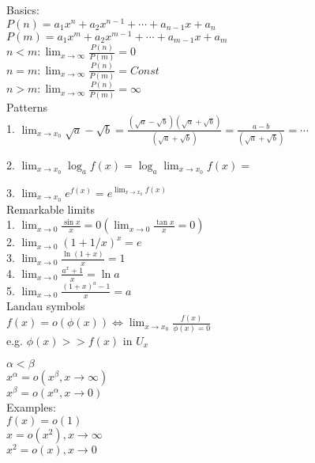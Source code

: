 \documentclass{letter}
\begin{document}
Basics: \\
$P(n)=a_1 x^n + a_2 x^{n-1} + \cdots + a_{n-1}x +  a_{n}$ \\
$P(m)=a_1 x^m + a_2 x^{m-1} + \cdots + a_{m-1}x +  a_{m}$ \\

$n < m: 
\lim_{x\to \infty} \frac{P(n)}{P(m)} = 0 $\\

$n = m: 
\lim_{x\to \infty} \frac{P(n)}{P(m)} = Const $\\

$n > m: 
\lim_{x\to \infty} \frac{P(n)}{P(m)} = \infty $\\

Patterns \\
1. $\lim_{x\to x_0} \sqrt{a} - \sqrt{b} = 
\frac{(\sqrt{a} - \sqrt{b})(\sqrt{a} + \sqrt{b})}{(\sqrt{a} + \sqrt{b})} =
\frac{a - b}{(\sqrt{a} + \sqrt{b})}  = \cdots $

2. $ \lim_{x\to x_0} \log_a{f(x)} =  \log_a {\lim_{x\to x_0} {f(x)} } =  $

3. $ \lim_{x\to x_0} e^{f(x)} =  e^ {\lim_{x\to x_0} {f(x)} }  $ \\

Remarkable limits \\
1. $ \lim_{x\to 0} \frac{\sin{x}}{x} = 0 (\lim_{x\to 0} \frac{\tan{x}}{x} = 0) $ \\
2. $ \lim_{x\to 0} (1 + 1/x)^x = e $ \\
3. $ \lim_{x\to 0} \frac{\ln{(1+x)}}{x} = 1 $ \\
4. $ \lim_{x\to 0} \frac{a^x + 1}{x} = \ln{a} $ \\
5. $ \lim_{x\to 0} \frac{(1 + x)^a - 1}{x} = a $ \\

Landau symbols \\
$ f(x) = o( \phi(x) ) \Leftrightarrow \lim_{x\to x_0} \frac{f(x)}{\phi(x) = 0} $ \\
e.g. $\phi(x) >> f(x)$ in $U_x$

$ \alpha < \beta $ \\
$x^{\alpha} = o(x^{\beta}, x\to \infty ) $ \\
$x^{\beta} = o(x^{\alpha}, x\to 0 )$ \\

Examples: \\
$ f(x) = o( 1 ) $ \\
$ x = o( x^2 ), x\to \infty $ \\
$ x^2 = o( x ), x\to 0 $ \\
\end{document}
